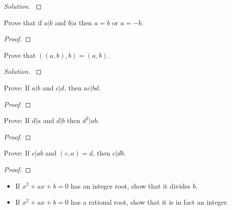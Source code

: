 \documentclass[11pt]{article}
\newenvironment{problem}[2][Problem]{\begin{trivlist}
\item[\hskip \labelsep {\bfseries #1}\hskip \labelsep {\bfseries #2.}]}{\end{trivlist}}
\newenvironment{solution}
  {\renewcommand\qedsymbol{$~$}\begin{proof}[Solution]$ $\par\nobreak\ignorespaces}
  {\end{proof}}
\begin{document}
\begin{solution}

\end{solution}



\begin{problem}{7} 
Prove that if $a|b$ and $b|a$ then $a=b$ or $a=-b$. 
\end{problem}

\begin{proof}

\end{proof}



\begin{problem}{9} 
Prove that $((a,b),b)=(a,b)$.
\end{problem}

\begin{solution}

\end{solution}



\begin{problem}{12} 
Prove: If $a|b$ and $c|d$, then $ac|bd$. 
\end{problem}

\begin{proof}

\end{proof}




\begin{problem}{13} 
Prove: If $d|a$ and $d|b$ then $d^2|ab$. 
\end{problem}

\begin{proof}

\end{proof}




\begin{problem}{14} 
Prove: If $c|ab$ and $(c,a)=d$, then $c|db$. 
\end{problem}

\begin{proof}

\end{proof}



\begin{problem}{15} 
\begin{itemize}
    \item [(a)] If $x^2+ax+b=0$ has an integer root, show that it divides $b$. 
    \item [(b)] If $x^2+ax+b=0$ has a rational root, show that it is in fact an integer.
\end{itemize}
\end{problem}
\end{document}
